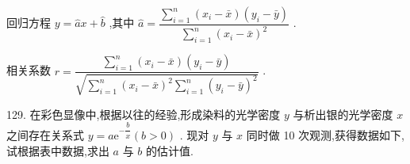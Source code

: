 回归方程 $y = \widehat{a}x + \widehat{b}$ ,其中 $\widehat{a} = \dfrac{\mathop{\sum }\limits_{{i = 1}}^{n}\left( {{x}_{i} - \bar{x}}\right) \left( {{y}_{i} - \bar{y}}\right) }{\mathop{\sum }\limits_{{i = 1}}^{n}{\left( {x}_{i} - \bar{x}\right) }^{2}}$ .

相关系数 $r = \dfrac{\mathop{\sum }\limits_{{i = 1}}^{n}\left( {{x}_{i} - \bar{x}}\right) \left( {{y}_{i} - \bar{y}}\right) }{\sqrt{\mathop{\sum }\limits_{{i = 1}}^{n}{\left( {x}_{i} - \bar{x}\right) }^{2}\mathop{\sum }\limits_{{i = 1}}^{n}{\left( {y}_{i} - \bar{y}\right) }^{2}}}$ .

129. 在彩色显像中,根据以往的经验,形成染料的光学密度 $y$ 与析出银的光学密度 $x$ 之间存在关系式 $y = a{\mathrm{e}}^{-\dfrac{b}{x}}\left( {b > 0}\right)$ . 现对 $y$ 与 $x$ 同时做 10 次观测,获得数据如下,试根据表中数据,求出 $a$ 与 $b$ 的估计值.

\begin{center}
\end{center}